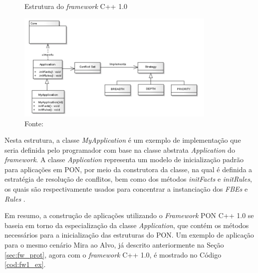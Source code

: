 \begin{figure}[!htb]
  \centering
  \caption{Estrutura do \textit{framework} C++ 1.0}
  \includegraphics[width=0.85\textwidth]{../figures/fw1_structure.png}
  \caption*{Fonte:
    }
  \label{fig:fw_pkg}
\end{figure}

Nesta estrutura, a classe \textit{MyApplication} é um exemplo de implementação
que seria definida pelo programador com base na classe abstrata
\textit{Application} do \textit{framework}. A classe \textit{Application}
representa um modelo de inicialização padrão para aplicações em PON, por meio da
construtora da classe, na qual é definida a estratégia de resolução de
conflitos, bem como dos métodos \textit{initFacts} e \textit{initRules}, os
quais são respectivamente usados para concentrar a instanciação dos
\textit{FBEs} e \textit{Rules} \cite{msc_Banaszewski_2009}.

Em resumo, a construção de aplicações utilizando o \textit{Framework} PON C++
1.0 se baseia em torno da especialização da classe \textit{Application}, que
contém os métodos necessários para a inicialização das estruturas do PON. Um
exemplo de aplicação para o mesmo cenário Mira ao Alvo, já descrito
anteriormente na Seção \ref{sec:fw_prot}, agora com o \textit{framework} C++
1.0, é mostrado no Código \ref{cod:fw1_ex}.

